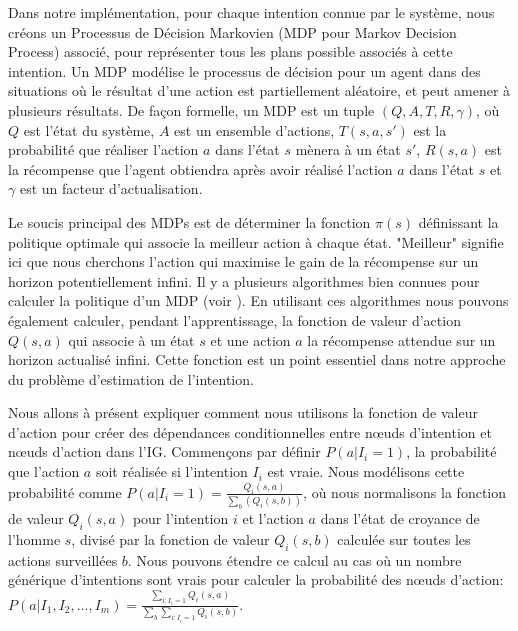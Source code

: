 \documentclass[a4paper,11pt,twoside]{StyleThese}
\begin{document}
Dans notre implémentation, pour chaque intention connue par le système, nous créons un Processus de Décision Markovien (MDP pour Markov Decision Process) associé, pour représenter tous les plans possible associés à cette intention. Un MDP modélise le processus de décision pour un agent dans des situations où le résultat d'une action est partiellement aléatoire, et peut amener à plusieurs résultats. De façon formelle, un MDP est un tuple  \((Q,A,T,R,\gamma)\), où $Q$ est l'état du système, $A$ est un ensemble d'actions, $T(s,a,s')$ est la probabilité que réaliser l'action $a$ dans l'état $s$ mènera à un état $s'$, $R(s,a)$ est la récompense que l'agent obtiendra après avoir réalisé l'action $a$ dans l'état $s$ et \(\gamma\) est un facteur d'actualisation.


Le soucis principal des MDPs est de déterminer la fonction \(\pi(s)\) définissant la politique  optimale qui associe la meilleur action à chaque état. "Meilleur" signifie ici que nous cherchons l'action qui maximise le gain de la récompense sur un horizon potentiellement infini. Il y a plusieurs algorithmes bien connues pour calculer la politique d'un MDP (voir \cite{2012Mausam}). En utilisant ces algorithmes nous pouvons également calculer, pendant l'apprentissage, la fonction de valeur d'action \(Q(s,a)\) qui associe à un état $s$ et une action $a$ la récompense attendue sur un horizon actualisé infini. Cette fonction est un point essentiel dans notre approche du problème d'estimation de l'intention.



Nous allons à présent expliquer comment nous utilisons la fonction de valeur d'action pour créer des dépendances conditionnelles entre nœuds d'intention et nœuds d'action dans l'IG. Commençons par définir \(P(a|I_i=1)\), la probabilité que l'action $a$ soit réalisée si l'intention $I_i$ est vraie. Nous modélisons cette probabilité comme \(P(a|I_i=1)=\frac{Q_i(s,a)}{\sum_b(Q_i(s,b))}\), où nous normalisons la fonction de valeur $Q_i(s,a)$ pour l'intention $i$ et l'action $a$ dans l'état de croyance de l'homme $s$, divisé par la fonction de valeur $Q_i(s,b)$ calculée sur toutes les actions surveillées $b$. Nous pouvons étendre ce calcul au cas où un nombre générique d'intentions sont vrais pour calculer la probabilité des nœuds d'action: \(P(a|I_1,I_2,...,I_m)=\frac{\sum_{i:I_i=1}Q_i(s,a)}{\sum_b\sum_{i:I_i=1}Q_i(s,b)}\).
\end{document}
